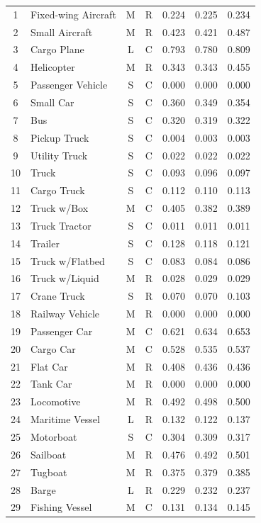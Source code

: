 \begin{center}
\begin{longtable}{|c|l|c|c|c|c|c|}
1 & Fixed-wing Aircraft & M & R & 0.224 & 0.225 & 0.234\\
2 & Small Aircraft & M & R & 0.423 & 0.421 & 0.487\\
3 & Cargo Plane & L & C & 0.793 & 0.780 & 0.809\\
4 & Helicopter & M & R & 0.343 & 0.343 & 0.455\\
5 & Passenger Vehicle & S & C & 0.000 & 0.000 & 0.000\\
6 & Small Car & S & C & 0.360 & 0.349 & 0.354\\
7 & Bus & S & C & 0.320 & 0.319 & 0.322\\
8 & Pickup Truck & S & C & 0.004 & 0.003 & 0.003\\
9 & Utility Truck & S & C & 0.022 & 0.022 & 0.022\\
10 & Truck & S & C & 0.093 & 0.096 & 0.097\\
11 & Cargo Truck & S & C & 0.112 & 0.110 & 0.113\\
12 & Truck w/Box & M & C & 0.405 & 0.382 & 0.389\\
13 & Truck Tractor & S & C & 0.011 & 0.011 & 0.011\\
14 & Trailer & S & C & 0.128 & 0.118 & 0.121\\
15 & Truck w/Flatbed & S & C & 0.083 & 0.084 & 0.086\\
16 & Truck w/Liquid & M & R & 0.028 & 0.029 & 0.029\\
17 & Crane Truck & S & R & 0.070 & 0.070 & 0.103\\
18 & Railway Vehicle & M & R & 0.000 & 0.000 & 0.000\\
19 & Passenger Car & M & C & 0.621 & 0.634 & 0.653\\
20 & Cargo Car & M & C & 0.528 & 0.535 & 0.537\\
21 & Flat Car & M & R & 0.408 & 0.436 & 0.436\\
22 & Tank Car & M & R & 0.000 & 0.000 & 0.000\\
23 & Locomotive & M & R & 0.492 & 0.498 & 0.500\\
24 & Maritime Vessel & L & R & 0.132 & 0.122 & 0.137\\
25 & Motorboat & S & C & 0.304 & 0.309 & 0.317\\
26 & Sailboat & M & R & 0.476 & 0.492 & 0.501\\
27 & Tugboat & M & R & 0.375 & 0.379 & 0.385\\
28 & Barge & L & R & 0.229 & 0.232 & 0.237\\
29 & Fishing Vessel & M & C & 0.131 & 0.134 & 0.145\\

\end{longtable}
\end{center}
